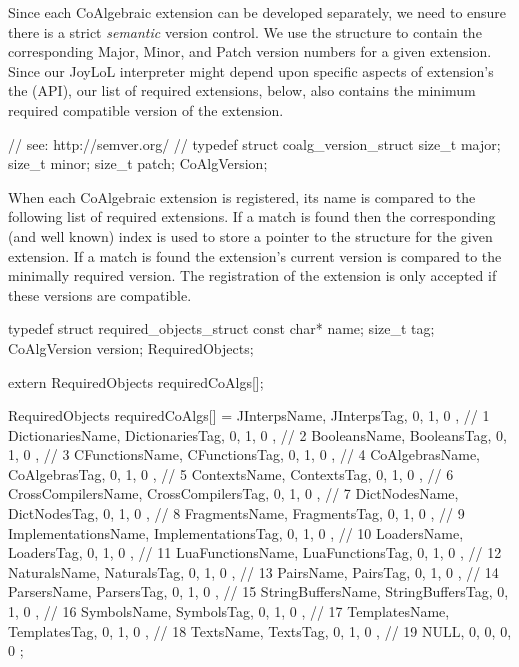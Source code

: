 Since each CoAlgebraic extension can be developed separately, we need to 
ensure there is a strict \emph{semantic} version control. We use the 
 structure to contain the corresponding Major, Minor, 
and Patch version numbers for a given extension. Since our JoyLoL 
interpreter might depend upon specific aspects of extension's the 
 (API), our list of required 
extensions, below, also contains the minimum required compatible version 
of the extension. 

\startCHeader
// see: http://semver.org/
//
typedef struct coalg_version_struct {
  size_t major;
  size_t minor;
  size_t patch;
} CoAlgVersion;
\stopCHeader

When each CoAlgebraic extension is registered, its name is compared to the 
following list of required extensions. If a match is found then the 
corresponding (and well known) index is used to store a pointer to the 
 structure for the given extension. If a match is found 
the extension's current version is compared to the minimally required 
version. The registration of the extension is only accepted if these 
versions are compatible. 

\startCHeader
typedef struct required_objects_struct {
  const char*  name;
  size_t       tag;
  CoAlgVersion version;
} RequiredObjects;

extern RequiredObjects requiredCoAlgs[];
\stopCHeader
{}

\startCCode
RequiredObjects requiredCoAlgs[] = {
  { JInterpsName,        JInterpsTag,        {0, 1, 0 }}, //  1
  { DictionariesName,    DictionariesTag,    {0, 1, 0 }}, //  2
  { BooleansName,        BooleansTag,        {0, 1, 0 }}, //  3
  { CFunctionsName,      CFunctionsTag,      {0, 1, 0 }}, //  4
  { CoAlgebrasName,      CoAlgebrasTag,      {0, 1, 0 }}, //  5
  { ContextsName,        ContextsTag,        {0, 1, 0 }}, //  6
  { CrossCompilersName,  CrossCompilersTag,  {0, 1, 0 }}, //  7
  { DictNodesName,       DictNodesTag,       {0, 1, 0 }}, //  8
  { FragmentsName,       FragmentsTag,       {0, 1, 0 }}, //  9
  { ImplementationsName, ImplementationsTag, {0, 1, 0 }}, // 10
  { LoadersName,         LoadersTag,         {0, 1, 0 }}, // 11
  { LuaFunctionsName,    LuaFunctionsTag,    {0, 1, 0 }}, // 12
  { NaturalsName,        NaturalsTag,        {0, 1, 0 }}, // 13
  { PairsName,           PairsTag,           {0, 1, 0 }}, // 14
  { ParsersName,         ParsersTag,         {0, 1, 0 }}, // 15
  { StringBuffersName,   StringBuffersTag,   {0, 1, 0 }}, // 16
  { SymbolsName,         SymbolsTag,         {0, 1, 0 }}, // 17
  { TemplatesName,       TemplatesTag,       {0, 1, 0 }}, // 18
  { TextsName,           TextsTag,           {0, 1, 0 }}, // 19
  { NULL,                0,                  {0, 0, 0 }}
};
\stopCCode

